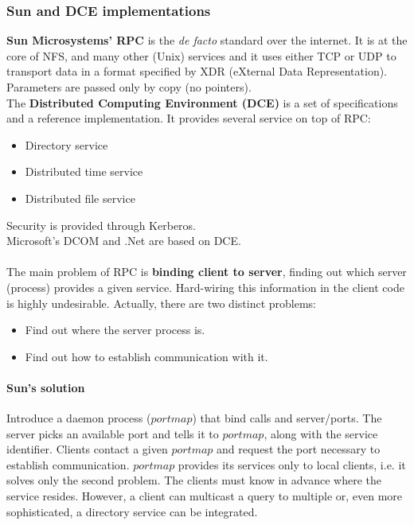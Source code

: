 \documentclass[10pt,a4paper]{article}
\begin{document}
\subsubsection{Sun and DCE implementations}
\textbf{Sun Microsystems' RPC} is the \textit{de facto} standard over the internet. It is at the core of NFS, and many other (Unix) services and it uses either TCP or UDP to transport data in a format specified by XDR (eXternal Data Representation). Parameters are passed only by copy (no pointers). \\
The \textbf{Distributed Computing Environment (DCE)} is a set of specifications and a reference implementation. It provides several service on top of RPC: 
\begin{itemize}
	\item Directory service
	\item Distributed time service
	\item Distributed file service
\end{itemize}
Security is provided through Kerberos. \\
Microsoft's DCOM and .Net are based on DCE. \\ \\
The main problem of RPC is \textbf{binding client to server}, finding out which server (process) provides a given service. Hard-wiring this information in the client code is highly undesirable. Actually, there are two distinct problems:
\begin{itemize}
	\item Find out where the server process is.
	\item Find out how to establish communication with it.
\end{itemize} 
\paragraph{Sun's solution}
Introduce a daemon process ($portmap$) that bind calls and server/ports. The server picks an available port and tells it to $portmap$, along with the service identifier. Clients contact a given $portmap$ and request the port necessary to establish communication. 
$portmap$ provides its services only to local clients, i.e. it solves only the second problem. The clients must know in advance where the service resides. However, a client can multicast a query to multiple or, even more sophisticated, a directory service can be integrated.
\end{document}
